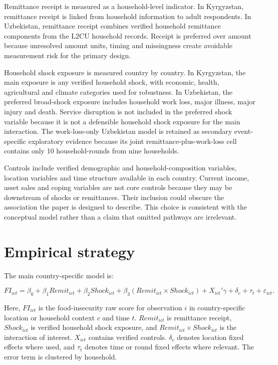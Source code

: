 \documentclass[11pt]{article}
\begin{document}
Remittance receipt is measured as a household-level indicator. In Kyrgyzstan, remittance receipt is linked from household information to adult respondents. In Uzbekistan, remittance receipt combines verified household remittance components from the L2CU household records. Receipt is preferred over amount because unresolved amount units, timing and missingness create avoidable measurement risk for the primary design.

Household shock exposure is measured country by country. In Kyrgyzstan, the main exposure is any verified household shock, with economic, health, agricultural and climate categories used for robustness. In Uzbekistan, the preferred broad-shock exposure includes household work loss, major illness, major injury and death. Service disruption is not included in the preferred shock variable because it is not a defensible household shock exposure for the main interaction. The work-loss-only Uzbekistan model is retained as secondary event-specific exploratory evidence because its joint remittance-plus-work-loss cell contains only 10 household-rounds from nine households.

Controls include verified demographic and household-composition variables, location variables and time structure available in each country. Current income, asset sales and coping variables are not core controls because they may be downstream of shocks or remittances. Their inclusion could obscure the association the paper is designed to describe. This choice is consistent with the conceptual model rather than a claim that omitted pathways are irrelevant.

\section{Empirical strategy}

The main country-specific model is:

\begin{equation}
FI_{ict}
=
\beta_0
+
\beta_1 Remit_{ict}
+
\beta_2 Shock_{ict}
+
\beta_3
\left(
Remit_{ict}\times Shock_{ict}
\right)
+
X_{ict}'\gamma
+
\delta_c
+
\tau_t
+
\varepsilon_{ict}.
\label{eq:main}
\end{equation}

Here, \(FI_{ict}\) is the food-insecurity raw score for observation \(i\) in country-specific location or household context \(c\) and time \(t\). \(Remit_{ict}\) is remittance receipt, \(Shock_{ict}\) is verified household shock exposure, and \(Remit_{ict} \times Shock_{ict}\) is the interaction of interest. \(X_{ict}\) contains verified controls. \(\delta_c\) denotes location fixed effects where used, and \(\tau_t\) denotes time or round fixed effects where relevant. The error term is clustered by household.
\end{document}

